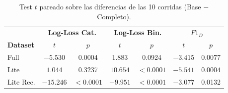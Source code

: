\begin{table}[htbp]
    \centering
    \caption{Test $t$ pareado sobre las diferencias de las 10 corridas (Base $-$ Completo).}
    \label{tab:test_t}
    \begin{tabular}{lcccccc}
        \toprule
        & \multicolumn{2}{c}{\textbf{Log-Loss Cat.}} & \multicolumn{2}{c}{\textbf{Log-Loss Bin.}} & \multicolumn{2}{c}{\textbf{$F1_D$}} \\
        \textbf{Dataset} & $t$ & $p$ & $t$ & $p$ & $t$ & $p$ \\
        \midrule
        Full & $-5.530$ & $0.0004$ & $1.883$ & 0.0924 & $-3.415$ & 0.0077 \\
        Lite & $1.044$ & 0.3237 & $10.654$ & $<0.0001$ & $-5.541$ & $0.0004$ \\
        Lite Rec. & $-15.246$ & $<0.0001$ & $-9.951$ & $<0.0001$ & $-3.077$ & 0.0132 \\
        \bottomrule
    \end{tabular}
\end{table}
